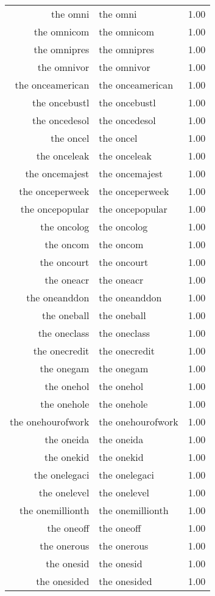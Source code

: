 \begin{table}[ht]
\begin{tabular}{rlr}
  the omni & the omni & 1.00 \\ 
  the omnicom & the omnicom & 1.00 \\ 
  the omnipres & the omnipres & 1.00 \\ 
  the omnivor & the omnivor & 1.00 \\ 
  the onceamerican & the onceamerican & 1.00 \\ 
  the oncebustl & the oncebustl & 1.00 \\ 
  the oncedesol & the oncedesol & 1.00 \\ 
  the oncel & the oncel & 1.00 \\ 
  the onceleak & the onceleak & 1.00 \\ 
  the oncemajest & the oncemajest & 1.00 \\ 
  the onceperweek & the onceperweek & 1.00 \\ 
  the oncepopular & the oncepopular & 1.00 \\ 
  the oncolog & the oncolog & 1.00 \\ 
  the oncom & the oncom & 1.00 \\ 
  the oncourt & the oncourt & 1.00 \\ 
  the oneacr & the oneacr & 1.00 \\ 
  the oneanddon & the oneanddon & 1.00 \\ 
  the oneball & the oneball & 1.00 \\ 
  the oneclass & the oneclass & 1.00 \\ 
  the onecredit & the onecredit & 1.00 \\ 
  the onegam & the onegam & 1.00 \\ 
  the onehol & the onehol & 1.00 \\ 
  the onehole & the onehole & 1.00 \\ 
  the onehourofwork & the onehourofwork & 1.00 \\ 
  the oneida & the oneida & 1.00 \\ 
  the onekid & the onekid & 1.00 \\ 
  the onelegaci & the onelegaci & 1.00 \\ 
  the onelevel & the onelevel & 1.00 \\ 
  the onemillionth & the onemillionth & 1.00 \\ 
  the oneoff & the oneoff & 1.00 \\ 
  the onerous & the onerous & 1.00 \\ 
  the onesid & the onesid & 1.00 \\ 
  the onesided & the onesided & 1.00 \\ 

\end{tabular}
\end{table}

